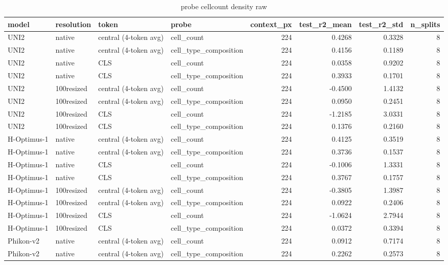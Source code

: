 \begin{table}
\caption{probe cellcount density raw}
\label{tab:probe_cellcount_density_raw}
\begin{tabular}{llllrrrr}
\toprule
model & resolution & token & probe & context_px & test_r2_mean & test_r2_std & n_splits \\
\midrule
UNI2 & native & central (4-token avg) & cell_count & 224 & 0.4268 & 0.3328 & 8 \\
UNI2 & native & central (4-token avg) & cell_type_composition & 224 & 0.4156 & 0.1189 & 8 \\
UNI2 & native & CLS & cell_count & 224 & 0.0358 & 0.9202 & 8 \\
UNI2 & native & CLS & cell_type_composition & 224 & 0.3933 & 0.1701 & 8 \\
UNI2 & 100resized & central (4-token avg) & cell_count & 224 & -0.4500 & 1.4132 & 8 \\
UNI2 & 100resized & central (4-token avg) & cell_type_composition & 224 & 0.0950 & 0.2451 & 8 \\
UNI2 & 100resized & CLS & cell_count & 224 & -1.2185 & 3.0331 & 8 \\
UNI2 & 100resized & CLS & cell_type_composition & 224 & 0.1376 & 0.2160 & 8 \\
H-Optimus-1 & native & central (4-token avg) & cell_count & 224 & 0.4125 & 0.3519 & 8 \\
H-Optimus-1 & native & central (4-token avg) & cell_type_composition & 224 & 0.3736 & 0.1537 & 8 \\
H-Optimus-1 & native & CLS & cell_count & 224 & -0.1006 & 1.3331 & 8 \\
H-Optimus-1 & native & CLS & cell_type_composition & 224 & 0.3767 & 0.1757 & 8 \\
H-Optimus-1 & 100resized & central (4-token avg) & cell_count & 224 & -0.3805 & 1.3987 & 8 \\
H-Optimus-1 & 100resized & central (4-token avg) & cell_type_composition & 224 & 0.0922 & 0.2406 & 8 \\
H-Optimus-1 & 100resized & CLS & cell_count & 224 & -1.0624 & 2.7944 & 8 \\
H-Optimus-1 & 100resized & CLS & cell_type_composition & 224 & 0.0372 & 0.3394 & 8 \\
Phikon-v2 & native & central (4-token avg) & cell_count & 224 & 0.0912 & 0.7174 & 8 \\
Phikon-v2 & native & central (4-token avg) & cell_type_composition & 224 & 0.2262 & 0.2573 & 8 \\

\end{tabular}
\end{table}
